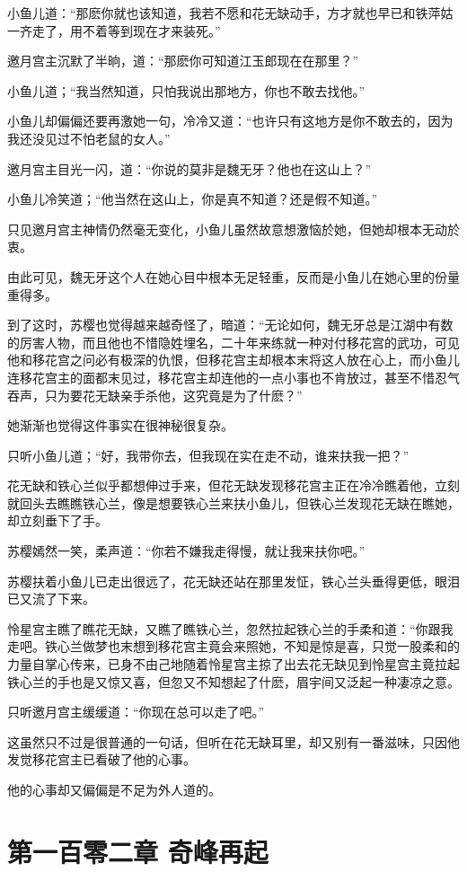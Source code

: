 \documentclass[12pt,oneside]{book}
\begin{document}
小鱼儿道：``那麽你就也该知道，我若不愿和花无缺动手，方才就也早已和铁萍姑一齐走了，用不着等到现在才来装死。''

邀月宫主沉默了半晌，道：``那麽你可知道江玉郎现在在那里？''

小鱼儿道；``我当然知道，只怕我说出那地方，你也不敢去找他。''

小鱼儿却偏偏还要再激她一句，冷冷又道：``也许只有这地方是你不敢去的，因为我还没见过不怕老鼠的女人。''

邀月宫主目光一闪，道：``你说的莫非是魏无牙？他也在这山上？''

小鱼儿冷笑道；``他当然在这山上，你是真不知道？还是假不知道。''

只见邀月宫主神情仍然毫无变化，小鱼儿虽然故意想激恼於她，但她却根本无动於衷。

由此可见，魏无牙这个人在她心目中根本无足轻重，反而是小鱼儿在她心里的份量重得多。

到了这时，苏樱也觉得越来越奇怪了，暗道：``无论如何，魏无牙总是江湖中有数的厉害人物，而且他也不惜隐姓埋名，二十年来练就一种对付移花宫的武功，可见他和移花宫之问必有极深的仇恨，但移花宫主却根本末将这人放在心上，而小鱼儿连移花宫主的面都末见过，移花宫主却连他的一点小事也不肯放过，甚至不惜忍气吞声，只为要花无缺亲手杀他，这究竟是为了什麽？''

她渐渐也觉得这件事实在很神秘很复杂。

只听小鱼儿道；``好，我带你去，但我现在实在走不动，谁来扶我一把？''

花无缺和铁心兰似乎都想伸过手来，但花无缺发现移花宫主正在冷冷瞧着他，立刻就回头去瞧瞧铁心兰，像是想要铁心兰来扶小鱼儿，但铁心兰发现花无缺在瞧她，却立刻垂下了手。

苏樱嫣然一笑，柔声道：``你若不嫌我走得慢，就让我来扶你吧。''

苏樱扶着小鱼儿已走出很远了，花无缺还站在那里发怔，铁心兰头垂得更低，眼泪已又流了下来。

怜星宫主瞧了瞧花无缺，又瞧了瞧铁心兰，忽然拉起铁心兰的手柔和道：``你跟我走吧。铁心兰做梦也末想到移花宫主竟会来照她，不知是惊是喜，只觉一股柔和的力量自掌心传来，已身不由己地随着怜星宫主掠了出去花无缺见到怜星宫主竟拉起铁心兰的手也是又惊又喜，但忽又不知想起了什麽，眉宇间又泛起一种凄凉之意。

只听邀月宫主缓缓道：``你现在总可以走了吧。''

这虽然只不过是很普通的一句话，但听在花无缺耳里，却又别有一番滋味，只因他发觉移花宫主已看破了他的心事。

他的心事却又偏偏是不足为外人道的。

\hypertarget{ux7b2cux4e00ux767eux96f6ux4e8cux7ae0-ux5947ux5cf0ux518dux8d77}{%
\chapter{第一百零二章
奇峰再起}\label{ux7b2cux4e00ux767eux96f6ux4e8cux7ae0-ux5947ux5cf0ux518dux8d77}}
\end{document}
